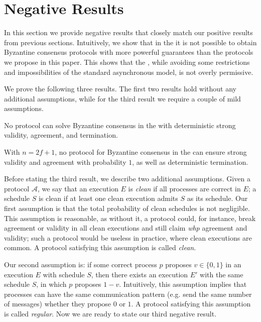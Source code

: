 \section{Negative Results}\label{sec:negative}
 
In this section we provide negative results that closely match our positive results from previous sections. Intuitively, we show that in the \model it is not possible to obtain Byzantine consensus protocols with more powerful guarantees than the protocols we propose in this paper. This shows that the \model, while avoiding some restrictions and impossibilities of the standard asynchronous model, is not overly permissive.  

We prove the following three results. The first two results hold without any additional assumptions, while for the third result we require a couple of mild assumptions.

\begin{theorem}\label{thm:flp}
   No protocol can solve Byzantine consensus in the \model with deterministic strong validity, agreement, and termination.
\end{theorem}

\begin{theorem}\label{thm:2f+1}
    With $n=2f+1$, no protocol for Byzantine consensus in the \model can ensure strong validity and agreement with probability $1$, as well as deterministic termination. 
\end{theorem}

Before stating the third result, we describe two additional assumptions. Given a protocol $\mathcal{A}$, we say that an execution $E$ is \textit{clean} if all processes are correct in $E$; a schedule $S$ is clean if at least one clean execution admits $S$ as its schedule. Our first assumption is that the total probability of clean schedules is not negligible.  This assumption is reasonable, as without it, a protocol could, for instance, break agreement or validity in all clean executions and still claim \textit{whp} agreement and validity; such a protocol would be useless in practice, where clean executions are common. A protocol satisfying this assumption is called \textit{clean}.

Our second assumption is: if some correct process $p$ proposes $v\in\{0,1\}$ in an execution $E$ with schedule $S$, then there exists an execution $E'$ with the same schedule $S$, in which $p$ proposes $1-v$. Intuitively, this assumption implies that processes can have the same communication pattern (e.g. send the same number of messages) whether they propose $0$ or $1$. A protocol satisfying this assumption is called \textit{regular}. Now we are ready to state our third negative result.   

